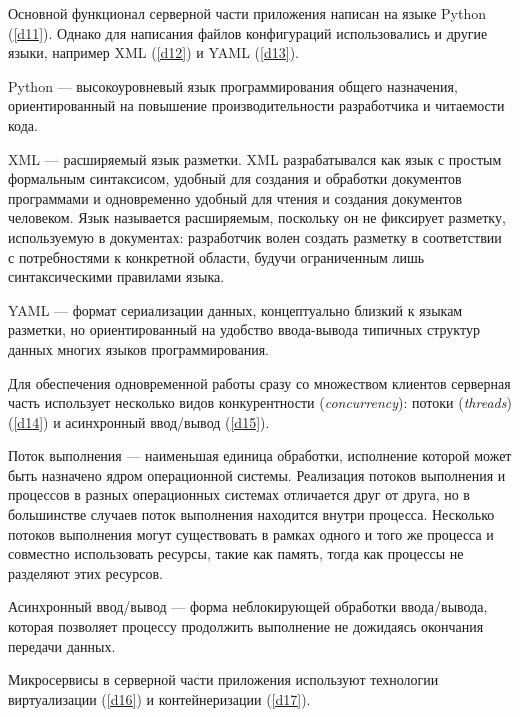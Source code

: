Основной функционал серверной части приложения написан на языке Python (\ref{d11}). Однако для написания файлов конфигураций
использовались и другие языки, например XML (\ref{d12}) и YAML (\ref{d13}).
\begin{definition}
    \label{d11}
    Python — высокоуровневый язык программирования общего назначения, ориентированный на повышение производительности
    разработчика и читаемости кода.
\end{definition}
\begin{definition}
    \label{d12}
    XML — расширяемый язык разметки. XML разрабатывался как язык с простым формальным синтаксисом, удобный для создания
    и обработки документов программами и одновременно удобный для чтения и создания документов человеком.
    Язык называется расширяемым, поскольку он не фиксирует разметку, используемую в документах:
    разработчик волен создать разметку в соответствии с потребностями к конкретной области, будучи ограниченным лишь
    синтаксическими правилами языка.
\end{definition}
\begin{definition}
    \label{d13}
    YAML — формат сериализации данных, концептуально близкий к языкам разметки, но ориентированный на удобство
    ввода-вывода типичных структур данных многих языков программирования.
\end{definition}
Для обеспечения одновременной работы сразу со множеством клиентов серверная часть использует несколько видов конкурентности
(\textit{concurrency}): потоки (\textit{threads}) (\ref{d14}) и асинхронный ввод/вывод (\ref{d15}).
\begin{definition}
    \label{d14}
    Поток выполнения — наименьшая единица обработки, исполнение которой может быть назначено ядром операционной системы.
    Реализация потоков выполнения и процессов в разных операционных системах отличается друг от друга, но в большинстве
    случаев поток выполнения находится внутри процесса. Несколько потоков выполнения могут существовать в рамках одного
    и того же процесса и совместно использовать ресурсы, такие как память, тогда как процессы не разделяют этих ресурсов.
\end{definition}
\begin{definition}
    \label{d15}
    Асинхронный ввод/вывод — форма неблокирующей обработки ввода/вывода, которая позволяет процессу
    продолжить выполнение не дожидаясь окончания передачи данных.
\end{definition}
Микросервисы в серверной части приложения используют технологии виртуализации (\ref{d16}) и контейнеризации (\ref{d17}).
